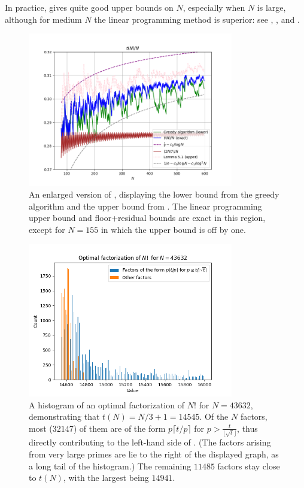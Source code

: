 \documentclass[12pt,a4paper,reqno]{amsart}
\numberwithin{equation}{section}
\theoremstyle{plain}
\theoremstyle{definition}
\begin{document}
In practice,  gives quite good upper bounds on $N$, especially when $N$ is large, although for medium $N$ the linear programming method is superior: see , , and .
    
\begin{figure}
  \centering
  \includegraphics[width=0.8\textwidth]{newplot_600.png}
  \vspace{-8pt}
  \caption{An enlarged version of , displaying the lower bound from the greedy algorithm and the upper bound from .  The linear programming upper bound and floor+residual bounds are exact in this region, except for $N=155$ in which the upper bound is off by one.}\label{fig-zoom}
\end{figure}


\begin{figure}
  \centering
  \includegraphics[width=0.8\textwidth]{factors.png}
  \caption{A histogram of an optimal factorization of $N!$ for $N=43632$, demonstrating that $t(N) = N/3+1 = 14545$.  Of the $N$ factors, most ($\num{32147}$) of them are of the form $p \lceil t/p \rceil$ for $p > \frac{t}{\lfloor \sqrt{t} \rfloor}$, thus directly contributing to the left-hand side of .  (The factors arising from very large primes are lie to the right of the displayed graph, as a long tail of the histogram.)  The remaining $\num{11485}$ factors stay close to $t(N)$, with the largest being $\num{14941}$.
  }\label{fig-factor}
  \end{figure}
  
\end{document}
